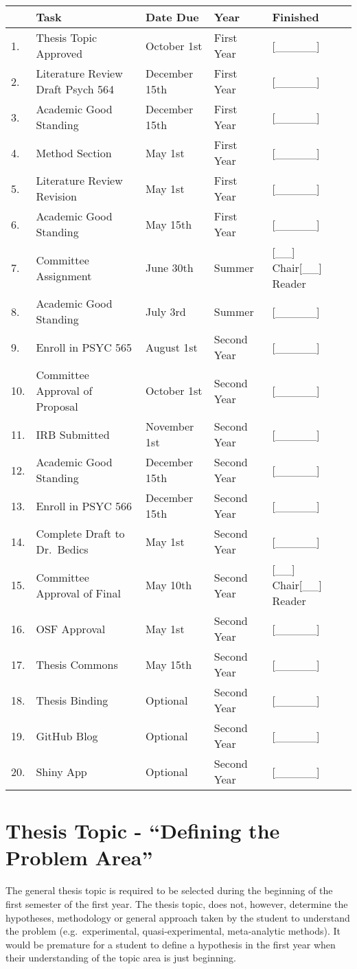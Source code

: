\documentclass[openany]{book}
\begin{document}
\begin{longtable}[]{@{}lllll@{}}
\toprule
& Task & Date Due & Year & Finished\tabularnewline
\midrule
\endhead
1. & Thesis Topic Approved & October 1st & First Year & {[}\_\_\_\_\_{]}\tabularnewline
2. & Literature Review Draft Psych 564 & December 15th & First Year & {[}\_\_\_\_\_{]}\tabularnewline
3. & Academic Good Standing & December 15th & First Year & {[}\_\_\_\_\_{]}\tabularnewline
4. & Method Section & May 1st & First Year & {[}\_\_\_\_\_{]}\tabularnewline
5. & Literature Review Revision & May 1st & First Year & {[}\_\_\_\_\_{]}\tabularnewline
6. & Academic Good Standing & May 15th & First Year & {[}\_\_\_\_\_{]}\tabularnewline
7. & Committee Assignment & June 30th & Summer & {[}\_\_{]} Chair{[}\_\_{]} Reader\tabularnewline
8. & Academic Good Standing & July 3rd & Summer & {[}\_\_\_\_\_{]}\tabularnewline
9. & Enroll in PSYC 565 & August 1st & Second Year & {[}\_\_\_\_\_{]}\tabularnewline
10. & Committee Approval of Proposal & October 1st & Second Year & {[}\_\_\_\_\_{]}\tabularnewline
11. & IRB Submitted & November 1st & Second Year & {[}\_\_\_\_\_{]}\tabularnewline
12. & Academic Good Standing & December 15th & Second Year & {[}\_\_\_\_\_{]}\tabularnewline
13. & Enroll in PSYC 566 & December 15th & Second Year & {[}\_\_\_\_\_{]}\tabularnewline
14. & Complete Draft to Dr.~Bedics & May 1st & Second Year & {[}\_\_\_\_\_{]}\tabularnewline
15. & Committee Approval of Final & May 10th & Second Year & {[}\_\_{]} Chair{[}\_\_{]} Reader\tabularnewline
16. & OSF Approval & May 1st & Second Year & {[}\_\_\_\_\_{]}\tabularnewline
17. & Thesis Commons & May 15th & Second Year & {[}\_\_\_\_\_{]}\tabularnewline
18. & Thesis Binding & Optional & Second Year & {[}\_\_\_\_\_{]}\tabularnewline
19. & GitHub Blog & Optional & Second Year & {[}\_\_\_\_\_{]}\tabularnewline
20. & Shiny App & Optional & Second Year & {[}\_\_\_\_\_{]}\tabularnewline
\bottomrule
\end{longtable}

\hypertarget{thesis-topic---defining-the-problem-area}{%
\section{Thesis Topic - ``Defining the Problem Area''}\label{thesis-topic---defining-the-problem-area}}

The general thesis topic is required to be selected during the beginning of the first semester of the first year. The thesis topic, does not, however, determine the hypotheses, methodology or general approach taken by the student to understand the problem (e.g.~experimental, quasi-experimental, meta-analytic methods). It would be premature for a student to define a hypothesis in the first year when their understanding of the topic area is just beginning.
\end{document}
